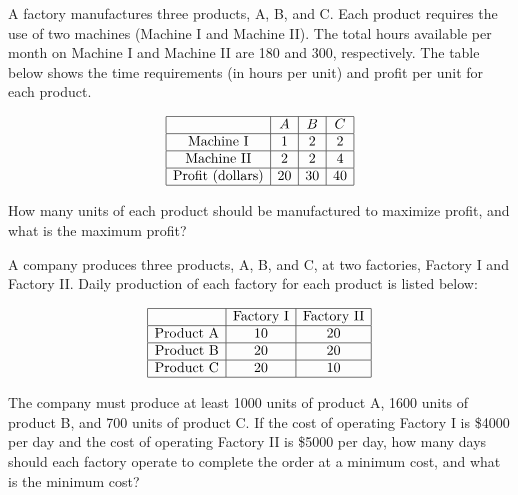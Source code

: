 \begin{ex}{}
A factory manufactures three products, A, B, and C. Each product requires the use of two machines (Machine I and Machine II). The total hours available per month on Machine I and Machine II are 180 and 300, respectively. The table below shows the time requirements (in hours per unit) and profit per unit for each product.

\[
\begin{array}{|c|c|c|c|}
\hline
 & A & B & C \\
\hline
\text{Machine I} & 1 & 2 & 2 \\
\hline
\text{Machine II} & 2 & 2 & 4 \\
\hline
\text{Profit (dollars)} & 20 & 30 & 40 \\
\hline
\end{array}
\]

How many units of each product should be manufactured to maximize profit, and what is the maximum profit?
\end{ex}

\begin{ex}{}
A company produces three products, A, B, and C, at two factories, Factory I and Factory II. Daily production of each factory for each product is listed below:

\[
\begin{array}{|c|c|c|}
\hline
 & \text{Factory I} & \text{Factory II} \\
\hline
\text{Product A} & 10 & 20 \\
\hline
\text{Product B} & 20 & 20 \\
\hline
\text{Product C} & 20 & 10 \\
\hline
\end{array}
\]

The company must produce at least 1000 units of product A, 1600 units of product B, and 700 units of product C. If the cost of operating Factory I is \$4000 per day and the cost of operating Factory II is \$5000 per day, how many days should each factory operate to complete the order at a minimum cost, and what is the minimum cost?
\end{ex}

